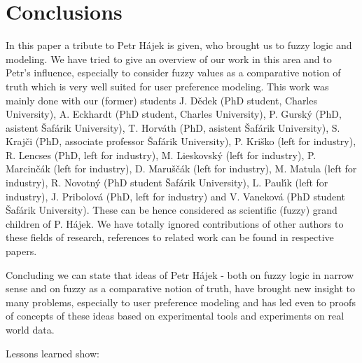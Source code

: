 \section{Conclusions}
In this paper a tribute to Petr H\'{a}jek is given, who brought us to fuzzy logic and modeling. We have tried to give an overview of our work in this area and to Petr's influence, especially to consider fuzzy values as a comparative notion of truth which is very well suited for user preference modeling. 
This work was mainly done with our (former) students
J. D\v edek (PhD student, Charles University),
A. Eckhardt  (PhD student, Charles University),
P. Gursk\'y (PhD, asistent \v Saf\'arik University),
T. Horv\'ath (PhD, asistent \v Saf\'arik University),
S. Kraj\v ci (PhD, associate professor \v Saf\'arik University),
P. Kri\v sko (left for industry),
R. Lencses (PhD, left for industry),
M. Lieskovsk\'y (left for industry),
P. Marcin\v c\'ak (left for industry),
D. Maru\v s\v c\'ak (left for industry),
M. Matula (left for industry),
R. Novotn\'y (PhD student \v Saf\'arik University),
L. Paul\'\i k (left for industry),
J. Pribolov\'a (PhD, left for industry) and
V. Vanekov\'a (PhD student \v Saf\'arik University).
These can be hence considered as scientific (fuzzy) grand children of P. H\'ajek.
We have totally ignored contributions of other authors to these fields of research, references to related work can be found in respective papers. 

     Concluding we can state that ideas of Petr H\'{a}jek - both on fuzzy logic in narrow sense and on fuzzy as a comparative notion of truth, have brought new insight to many problems, especially to user preference modeling and has led  even to proofs of concepts of these ideas based on experimental tools and experiments on real world data.
     
          Lessons learned show:

